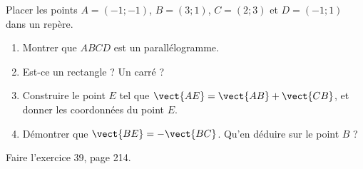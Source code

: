 
\begin{exercice}\label{exosmath-0591}

    Placer les points \( A=(-1;-1)\), \( B=(3;1)\), \( C=(2;3)\) et \( D=(-1;1)\) dans un repère.
    \begin{enumerate}
        \item
            Montrer que \( ABCD\) est un parallélogramme.
        \item
            Est-ce un rectangle ? Un carré ?
        \item
            Construire le point \( E\) tel que \( \vect{ AE }=\vect{ AB }+\vect{ CB }\), et donner les coordonnées du point \( E\).
        \item
            Démontrer que \( \vect{ BE}=-\vect{ BC } \). Qu'en déduire sur le point \( B\) ?
    \end{enumerate}

    Faire l'exercice 39, page 214.

\end{exercice}

